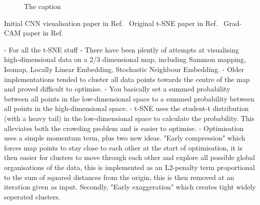 \begin{figure}
{    }
    \quad
    \caption[The caption]
    {The caption}
\end{figure}

Initial CNN visualisation paper in Ref.~\cite{zeiler2013}
Original t-SNE paper in Ref.~\cite{maaten2008}
Grad-CAM paper in Ref.~\cite{selvaraju2017}

- For all the t-SNE stuff
- There have been plently of attempts at visualising high-dimensional data on a 2/3 dimensional
map, including Sammon mapping, Isomap, Locally Linear Embedding, Stochastic Neighbour Embedding.
- Older implementations tended to cluster all data points towards the centre of the map and proved
difficult to optimise.
- You basically set a summed probability between all points in the low-dimensional space to a
summed probability between all points in the high-dimensional space.
- t-SNE uses the student-t distribution (with a heavy tail) in the low-dimensional space to
calculate the probability. This alleviates both the crowding problem and is easier to optimise.
- Optimisation uses a simple momentum term, plus two new ideas. "Early compression" which forces
map points to stay close to each other at the start of optimisation, it is then easier for
clusters to move through each other and explore all possible global organisations of the data,
this is implemented as an L2-penalty term proportional to the sum of squared distances from the
origin, this is then removed at an iteration given as input. Secondly, "Early exaggeration" which
creates tight widely seperated clusters.